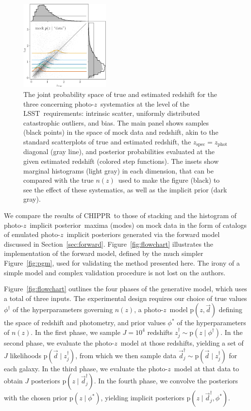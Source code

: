 \documentclass[iop]{emulateapj}
\newcommand{\Sect}[1]{Section~\ref{#1}}
\newcommand{\Fig}[1]{Figure~\ref{#1}}
\newcommand{\project}[1]{\textsc{#1}}
\newcommand{\lsst}{\project{LSST}}
\newcommand{\Chippr}{\project{CHIPPR}}
\newcommand{\data}{\ensuremath{\vec{d}}}
\newcommand{\pr}[1]{\ensuremath{\mathrm{p}(#1)}}
\newcommand{\gvn}{\mid}
\newcommand{\pz}{photo-$z$}
\newcommand{\pzip}{\pz\ implicit posterior}
\newcommand{\nz}{$n(z)$}
\begin{document}
\begin{figure}%
	\begin{center}
		\includegraphics[width=0.4\textwidth]{data_lsst.png}
		\caption{
			The joint probability space of true and estimated redshift for the three concerning \pz\ systematics at the level of the \lsst\ requirements: 
			intrinsic scatter, uniformly distributed catastrophic outliers, and bias.
			The main panel shows samples (black points) in the space of mock data and redshift, akin to the standard scatterplots of true and estimated redshift, the $z_{\mathrm{spec}} = z_{\mathrm{phot}}$ diagonal (gray line), and posterior probabilities evaluated at the given estimated redshift (colored step functions).
			The insets show marginal histograms (light gray) in each dimension, that can be compared with the true \nz\ used to make the figure (black) to see the effect of these systematics, as well as the implicit prior (dark gray).
		}
		\label{fig:mega_scatter}
	\end{center}
\end{figure}

We compare the results of \Chippr\ to those of stacking and the histogram of \pzip\ maxima (modes) on mock data in the form of catalogs of emulated \pzip s generated via the forward model discussed in \Sect{sec:forward}.
\Fig{fig:flowchart} illustrates the implementation of the forward model, defined by the much simpler \Fig{fig:pgm}, used for validating the method presented here.
The irony of a simple model and complex validation procedure is not lost on the authors.

\Fig{fig:flowchart} outlines the four phases of the generative model, which uses a total of three inputs.
The experimental design requires our choice of true values $\phi^{\dagger}$ of the hyperparameters governing \nz, a \pz\ model $\pr{z, \data}$ defining the space of redshift and photometry, and prior values $\phi^{*}$ of the hyperparameters of \nz.
In the first phase, we sample $J = 10^{4}$ redshifts $z_{j}^{\dagger} \sim \pr{z \gvn \phi^{\dagger}}$.
In the second phase, we evaluate the \pz\ model at those redshifts, yielding a set of $J$ likelihoods $\pr{\data \gvn z_{j}^{\dagger}}$, from which we then sample data $\data_{j}^{\dagger} \sim \pr{\data \gvn z_{j}^{\dagger}}$ for each galaxy.
In the third phase, we evaluate the \pz\ model at that data to obtain $J$ posteriors $\pr{z \gvn \data_{j}^{\dagger}}$.
In the fourth phase, we convolve the posteriors with the chosen prior $\pr{z \gvn \phi^{*}}$, yielding implicit posteriors $\pr{z \gvn \data_{j}^{\dagger}, \phi^{*}}$.
\end{document}
